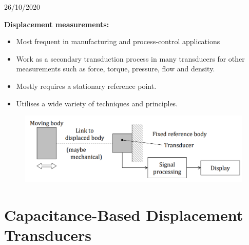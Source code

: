 \documentclass[class=report, crop=false, 12pt,a4paper]{standalone}
\begin{document}
\begin{center}
  26/10/2020
\end{center}
\textbf{Displacement measurements:}
\begin{itemize}
  \item Most frequent in manufacturing and process-control applications
  \item Work as a secondary transduction process in many transducers for other measurements such as force, torque, pressure, flow and density.
  \item Mostly requires a stationary reference point.
  \item Utilises a wide variety of techniques and principles.
\end{itemize}
\begin{figure}[H]
  \centering
  \includegraphics[width = 0.8 \textwidth]{../img/Mdiagram1.PNG}
\end{figure}
\section{Capacitance-Based Displacement Transducers}
\end{document}
